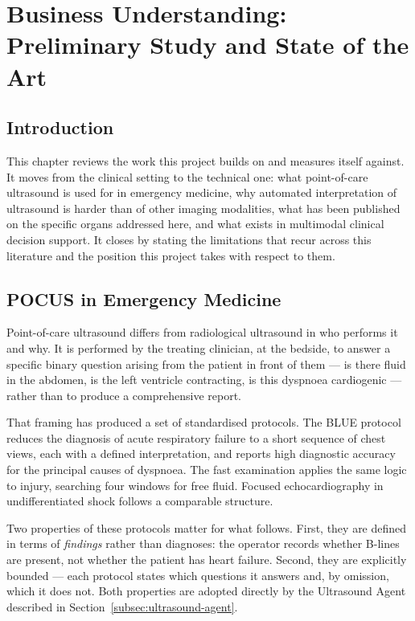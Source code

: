 \section{Business Understanding: Preliminary Study and State of the Art}
\label{sec:sota}

\subsection{Introduction}

This chapter reviews the work this project builds on and measures itself against. It moves
from the clinical setting to the technical one: what point-of-care ultrasound is used for
in emergency medicine, why automated interpretation of ultrasound is harder than of other
imaging modalities, what has been published on the specific organs addressed here, and what
exists in multimodal clinical decision support. It closes by stating the limitations that
recur across this literature and the position this project takes with respect to them.

\subsection{POCUS in Emergency Medicine}
\label{subsec:sota-pocus}

Point-of-care ultrasound differs from radiological ultrasound in who performs it and why.
It is performed by the treating clinician, at the bedside, to answer a specific binary
question arising from the patient in front of them --- is there fluid in the abdomen, is
the left ventricle contracting, is this dyspnoea cardiogenic --- rather than to produce a
comprehensive report.

That framing has produced a set of standardised protocols. The BLUE protocol
\cite{lichtenstein2008blue} reduces the diagnosis of acute respiratory failure to a short
sequence of chest views, each with a defined interpretation, and reports high diagnostic
accuracy for the principal causes of dyspnoea. The \gls{fast} examination applies the same
logic to injury, searching four windows for free fluid. Focused echocardiography in
undifferentiated shock follows a comparable structure.

Two properties of these protocols matter for what follows. First, they are defined in terms
of \emph{findings} rather than diagnoses: the operator records whether B-lines are present,
not whether the patient has heart failure. Second, they are explicitly bounded --- each
protocol states which questions it answers and, by omission, which it does not. Both
properties are adopted directly by the Ultrasound Agent described in
Section~\ref{subsec:ultrasound-agent}.

